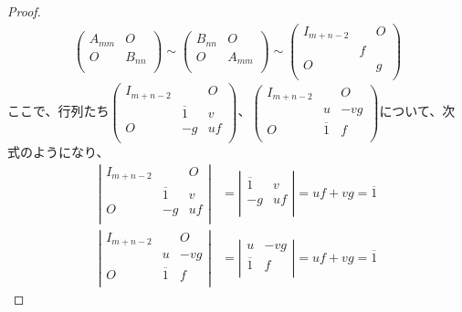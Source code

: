 \documentclass[dvipdfmx]{jsarticle}
\begin{document}
\begin{proof}
\begin{align*}
\begin{pmatrix}
A_{mm} & O \\
O & B_{nn} \\
\end{pmatrix} \sim \begin{pmatrix}
B_{nn} & O \\
O & A_{mm} \\
\end{pmatrix} \sim \begin{pmatrix}
I_{m + n - 2} & \  & O \\
\  & f & \  \\
O & \  & g \\
\end{pmatrix}
\end{align*}
ここで、行列たち$\begin{pmatrix}
I_{m + n - 2} & \  & O \\
\  & \overline{1} & v \\
O & -g & uf \\
\end{pmatrix}$、$\begin{pmatrix}
I_{m + n - 2} & \  & O \\
\  & u & - vg \\
O & \overline{1} & f \\
\end{pmatrix}$について、次式のようになり、
\begin{align*}
\left| \begin{matrix}
I_{m + n - 2} & \  & O \\
\  & \overline{1} & v \\
O & - g & uf \\
\end{matrix} \right| &= \left| \begin{matrix}
\overline{1} & v \\
 - g & uf \\
\end{matrix} \right| = uf + vg = \overline{1}\\
\left| \begin{matrix}
I_{m + n - 2} & \  & O \\
\  & u & - vg \\
O & \overline{1} & f \\
\end{matrix} \right| &= \left| \begin{matrix}
u & - vg \\
\overline{1} & f \\
\end{matrix} \right| = uf + vg = \overline{1}

\end{align*}
\end{proof}
\end{document}
